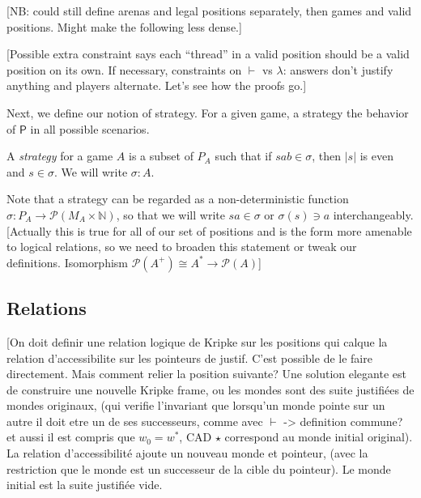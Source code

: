 \documentclass[acmsmall,anonymous]{acmart}
\newcommand{\kw}[1]{\ensuremath{ \textsf{#1} }}
\begin{document}
[NB: could still define arenas and legal positions separately,
then games and valid positions.
Might make the following less dense.]

[Possible extra constraint says each ``thread''
in a valid position should be a valid position on its own.
If necessary, constraints on $\vdash$ vs $\lambda$:
answers don't justify anything and players alternate.
Let's see how the proofs go.]

Next,
we define our notion of strategy.
For a given game,
a strategy the behavior of $\kw{P}$
in all possible scenarios.

\begin{definition}[Strategy]
A \emph{strategy} for a game $A$
is a subset of $P_A$ such that if $s a b \in \sigma$,
then $|s|$ is even and $s \in \sigma$.
We will write $\sigma : A$.
\end{definition}

Note that a strategy can be regarded as
a non-deterministic function
$\sigma : P_A \rightarrow \mathcal{P}(M_A \times \mathbb{N})$,
so that we will write $sa \in \sigma$ or $\sigma(s) \ni a$
interchangeably.
[Actually this is true for all of our set of positions
and is the form more amenable to logical relations,
so we need to broaden this statement or
tweak our definitions.
Isomorphism $\mathcal{P}(A^+) \cong A^* \rightarrow \mathcal{P}(A)$]


\subsection{Relations} %

[On doit definir une relation logique de Kripke sur les positions
qui calque la relation d'accessibilite sur les pointeurs de justif.
C'est possible de le faire directement.
Mais comment relier la position suivante?
Une solution elegante est de
construire une nouvelle Kripke frame,
ou les mondes sont des suite justifi\'ees de mondes originaux,
(qui verifie l'invariant que lorsqu'un monde pointe sur un autre
il doit etre un de ses successeurs,
comme avec $\vdash$ -> definition commune?
et aussi il est compris que $w_0 = w^*$,
CAD $\star$ correspond au monde initial original).
La relation d'accessibilit\'e ajoute un nouveau monde et pointeur,
(avec la restriction que le monde est un successeur
de la cible du pointeur).
Le monde initial est la suite justifi\'ee vide.
\end{document}

